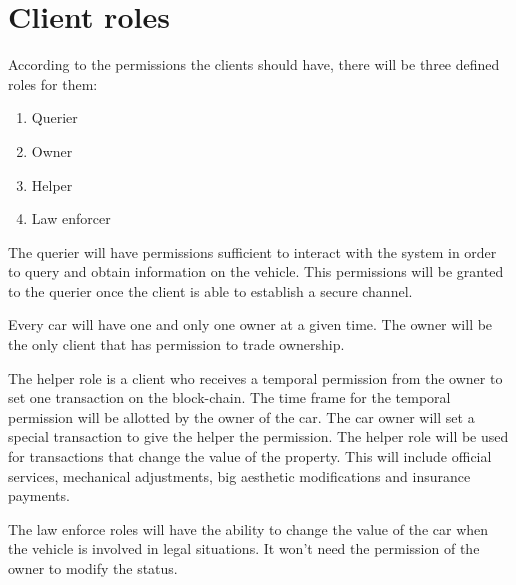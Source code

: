 \section{Client roles}

According to the permissions the clients should have, there will be three defined roles for them:

\begin{enumerate}
    \item Querier
    \item Owner
    \item Helper
    \item Law enforcer
\end{enumerate}

The querier will have permissions sufficient to interact with the system in order to query and obtain information on the vehicle. This permissions will be granted to the querier once the client is able to establish a secure channel.

Every car will have one and only one owner at a given time. The owner will be the only client that has permission to trade ownership. 


The helper role is a client who receives a temporal permission from the owner to set one transaction on the block-chain. The time frame for the temporal permission will be allotted by the owner of the car. The car owner will set a special transaction to give the helper the permission. 
The helper role will be used for transactions that change the value of the property. This will include official services, mechanical adjustments, big aesthetic modifications and insurance payments.

The law enforce roles will have the ability to change the value of the car when the vehicle is involved in legal situations. It won’t need the permission of the owner to modify the status.